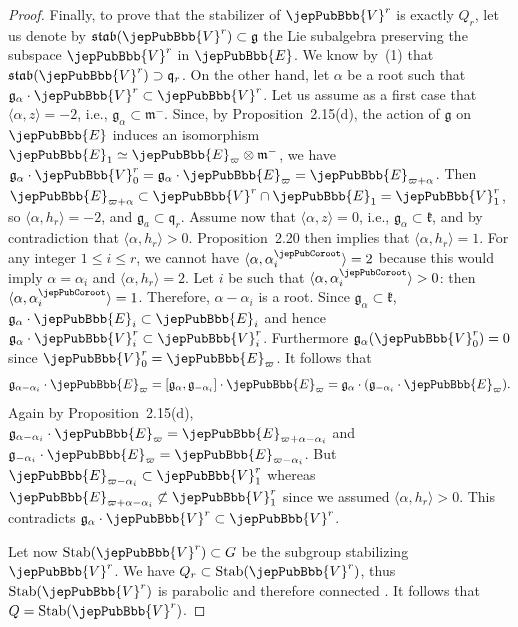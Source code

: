 \begin{proof}
Finally, to prove that the stabilizer of $\jepPubBbb{V}^r$ is exactly $Q_r$, let us denote by $\mathfrak{stab}(\jepPubBbb{V}^r)\subset\mathfrak g$ the Lie subalgebra preserving the subspace $\jepPubBbb{V}^r$ in $\jepPubBbb{E}$. We know by~(1) that $\mathfrak{stab}(\jepPubBbb{V}^r)\supset\mathfrak q_r$. On the other hand, let $\alpha$ be a root such that $\mathfrak g_\alpha\cdot\jepPubBbb{V}^r\subset\jepPubBbb{V}^r$. Let us assume as a first case that $\langle\alpha,z\rangle=-2$, i.e., $\mathfrak g_\alpha\subset\mathfrak m^-$. Since, by Proposition~2.15(d), the action of $\mathfrak g$ on $\jepPubBbb{E}$ induces an isomorphism $\jepPubBbb{E}_1\simeq\jepPubBbb{E}_\varpi\otimes\mathfrak m^-$, we have $\mathfrak g_\alpha\cdot\jepPubBbb{V}^r_0=\mathfrak g_\alpha\cdot\jepPubBbb{E}_\varpi=\jepPubBbb{E}_{\varpi+\alpha}$. Then $\jepPubBbb{E}_{\varpi+\alpha}\subset\jepPubBbb{V}^r\cap\jepPubBbb{E}_1=\jepPubBbb{V}^r_1$, so $\langle\alpha,h_r\rangle=-2$, and $\mathfrak g_a\subset\mathfrak q_r$. Assume now that $\langle\alpha,z\rangle=0$, i.e., $\mathfrak g_\alpha\subset\mathfrak k$, and by contradiction that $\langle\alpha,h_r\rangle>0$. Proposition~2.20 then implies that $\langle\alpha,h_r\rangle=1$. For any integer $1\leqslant i\leqslant r$, we cannot have $\langle\alpha,\alpha_i^\jepPubCoroot\rangle=2$ because this would imply $\alpha=\alpha_i$ and $\langle\alpha,h_r\rangle=2$. Let $i$ be such that $\langle\alpha,\alpha_i^\jepPubCoroot\rangle>0$: then $\langle\alpha,\alpha_i^\jepPubCoroot\rangle=1$. Therefore, $\alpha-\alpha_i$ is a root. Since $\mathfrak g_\alpha\subset\mathfrak k$, $\mathfrak g_\alpha\cdot\jepPubBbb{E}_i\subset\jepPubBbb{E}_i$ and hence $\mathfrak g_\alpha\cdot\jepPubBbb{V}^r_i\subset\jepPubBbb{V}^r_i$. Furthermore $\mathfrak g_\alpha(\jepPubBbb{V}^r_0)=0$ since $\jepPubBbb{V}^r_0=\jepPubBbb{E}_\varpi$. It follows that
\[
\mathfrak g_{\alpha-\alpha_i}\cdot\jepPubBbb{E}_\varpi=[\mathfrak g_\alpha,\mathfrak g_{-\alpha_i}]\cdot\jepPubBbb{E}_\varpi=\mathfrak g_\alpha\cdot(\mathfrak g_{-\alpha_i}\cdot\jepPubBbb{E}_\varpi).
\]
Again by Proposition~2.15(d), $\mathfrak g_{\alpha-\alpha_i}\cdot\jepPubBbb{E}_\varpi=\jepPubBbb{E}_{\varpi+\alpha-\alpha_i}$ and $\mathfrak g_{-\alpha_i}\cdot\jepPubBbb{E}_\varpi=\jepPubBbb{E}_{\varpi-\alpha_i}$. But $\jepPubBbb{E}_{\varpi-\alpha_i}\subset\jepPubBbb{V}^r_1$ whereas $\jepPubBbb{E}_{\varpi+\alpha-\alpha_i}\not\subset\jepPubBbb{V}^r_1$ since we assumed $\langle\alpha,h_r\rangle>0$. This contradicts $\mathfrak g_\alpha\cdot\jepPubBbb{V}^r\subset\jepPubBbb{V}^r$.

Let now $\operatorname{Stab}(\jepPubBbb{V}^r)\subset G$ be the subgroup stabilizing $\jepPubBbb{V}^r$. We have $Q_r\subset\operatorname{Stab}(\jepPubBbb{V}^r)$, thus $\operatorname{Stab}(\jepPubBbb{V}^r)$ is parabolic and therefore connected \cite[Cor.~23.1.B]{jep93Hum75}. It follows that $Q=\operatorname{Stab}(\jepPubBbb{V}^r)$.
\end{proof}

